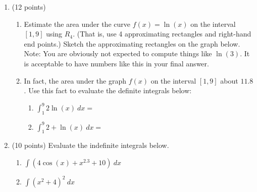 \documentclass[12pt]{article}
\begin{document}
\begin{enumerate}
\newpage

\item (12 points) 
\begin{enumerate}
\item Estimate the area under the curve $f(x)=\ln(x)$ on the interval $[1,9]$ using $R_4.$ (That is, use 4 approximating rectangles and right-hand end points.) Sketch the approximating rectangles on the graph below.\\
Note: You are obviously not expected to compute things like $\ln(3)$. It is acceptable to have numbers like this in your final answer.\\

\vfill
\item In fact, the area under the graph $f(x)$ on the interval $[1,9]$ about $11.8$. Use this fact to evaluate the definite integrals below:
	\begin{enumerate}
	\item $\displaystyle \int_1^9 2 \ln(x) \: dx=$
	\vfill
	\item $\displaystyle \int_1^9 2+ \ln(x) \: dx=$
	\vfill
	\end{enumerate}
\end{enumerate}
\newpage
\item (10 points) Evaluate the indefinite integrals below. 
	\begin{enumerate}
	\item $ \displaystyle \int (4\cos(x)+x^{2.3} + 10) \: dx$
	\vfill
	\item $ \displaystyle \int (x^2+4)^2 \: dx $
	\vfill
	\end{enumerate}

\end{enumerate}
\end{document}
